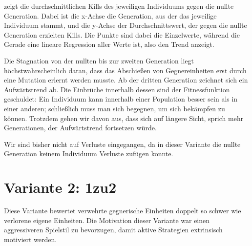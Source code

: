 \documentclass[
	12pt,
	a4paper,
	BCOR10mm,
	DIV14,
	headsepline,
	usegeometry,
]{scrreprt}
\begin{document}
 zeigt die durchschnittlichen Kills des jeweiligen Individuums gegen die nullte Generation.
Dabei ist die x-Achse die Generation, aus der das jeweilige Individuum stammt, und die y-Achse der Durchschnittswert, der gegen die nullte Generation erzielten Kills.
Die Punkte sind dabei die Einzelwerte, während die Gerade eine lineare Regression aller Werte ist, also den Trend anzeigt.

Die Stagnation von der nullten bis zur zweiten Generation liegt höchstwahrscheinlich daran, dass das Abschießen von Gegnereinheiten erst durch eine Mutation erlernt werden musste.
Ab der dritten Generation zeichnet sich ein Aufwärtstrend ab.
Die Einbrüche innerhalb dessen sind der Fitnessfunktion geschuldet: Ein Individuum kann innerhalb einer Population besser sein als in einer anderen; schließlich muss man sich begegnen, um sich bekämpfen zu können.
Trotzdem gehen wir davon aus, dass sich auf längere Sicht, sprich mehr Generationen, der Aufwärtstrend fortsetzen würde.

Wir sind bisher nicht auf Verluste eingegangen, da in dieser Variante die nullte Generation keinem Individuum Verluste zufügen konnte.

\section{Variante 2: 1zu2}
Diese Variante bewertet verwehrte gegnerische Einheiten doppelt so schwer wie verlorene eigene Einheiten.
Die Motivation dieser Variante war einen aggressiveren Spielstil zu bevorzugen, damit aktive Strategien extrinsisch motiviert werden.
\end{document}
